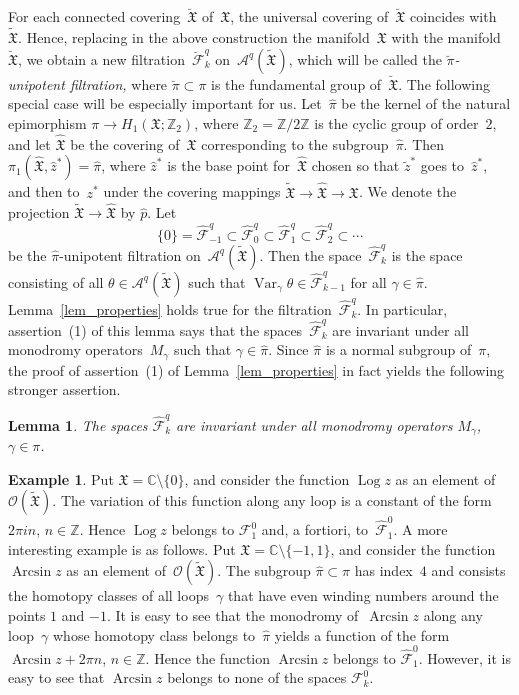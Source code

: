 \documentclass[reqno,tbtags,12pt]{amsart}
\numberwithin{equation}{section}
\newcommand{\C}{\mathbb{C}}
\newcommand{\Z}{\mathbb{Z}}
\newcommand{\FX}{\mathfrak{X}}
\newcommand{\tFX}{\widetilde{\mathfrak{X}}}
\newcommand{\hFX}{\widehat{\mathfrak{X}}}
\newcommand{\hpi}{\hat{\pi}}
\newcommand{\CF}{\mathcal{F}}
\newcommand{\hCF}{\widehat{\mathcal{F}}}
\newcommand{\CO}{\mathcal{O}}
\newcommand{\A}{\mathcal{A}}
\newcommand{\hp}{\hat{p}}
\newcommand{\tz}{\tilde{z}}
\newcommand{\hz}{\hat{z}}
\newcommand{\Arcsin}{\mathop{\mathrm{Arcsin}}\nolimits}
\newcommand{\Log}{\mathop{\mathrm{Log}}\nolimits}
\newcommand{\Var}{\mathop{\mathrm{Var}}\nolimits}
\newtheorem{lem}[theorem]{Lemma}
\theoremstyle{definition}
\newtheorem{example}[theorem]{Example}
\begin{document}
For each connected covering~$\breve{\FX}$ of~$\FX$, the universal covering of~$\breve{\FX}$ coincides with~$\tFX$. Hence, replacing in the above construction the manifold~$\FX$ with the manifold~$\breve{\FX}$, we obtain a new filtration~$\breve{\CF}_k^q$ on~$\A^q(\tFX)$, which will be called the \textit{$\breve{\pi}$-unipotent filtration,} where $\breve{\pi}\subset\pi$ is the fundamental group of~$\breve{\FX}$. The following special case will be especially important for us. Let~$\hpi$ be the kernel of the natural epimorphism $\pi\to H_1(\FX;\Z_2)$, where $\Z_2=\Z/2\Z$ is the cyclic group of order~$2$, and let $\hFX$ be the covering of~$\FX$ corresponding to the subgroup~$\hpi$.  Then $\pi_1(\hFX,\hz^*)=\hpi$, where $\hz^*$ is the base point for~$\hFX$  chosen so that $\tz^*$ goes to~$\hz^*$, and then to~$z^*$  under the covering mappings $\tFX\to\hFX\to\FX$. We denote the projection $\tFX\to\hFX$ by $\hp$. Let 
$$
\{0\}=\hCF_{-1}^q\subset\hCF_0^q\subset\hCF_1^q\subset\hCF_2^q\subset\cdots
$$
be the $\hpi$-unipotent filtration on~$\A^q(\tFX)$. Then the space~$\hCF_k^q$ is the space consisting of all   $\theta\in\A^q(\tFX)$ such that $\Var_{\gamma}\theta\in\hCF_{k-1}^q$ for all $\gamma\in\hpi$.
Lemma~\ref{lem_properties} holds true for the filtration~$\hCF_k^q$. In particular,  assertion~(1) of this lemma says that the spaces~$\hCF_k^q$ are invariant under all monodromy operators~$M_{\gamma}$ such that $\gamma\in\hpi$. Since $\hpi$ is a normal subgroup of~$\pi$, the proof of  assertion~(1) of Lemma~\ref{lem_properties} in fact yields the following stronger assertion.

\begin{lem}
The spaces $\hCF_k^q$ are invariant under all monodromy operators $M_{\gamma}$, $\gamma\in\pi$.
\end{lem} 

\begin{example}
Put $\FX=\C\setminus\{0\}$, and consider the function $\Log z$ as an element of~$\CO(\tFX)$. The variation of this function along any loop is a constant of the form $2\pi i n$, $n\in\Z$. Hence $\Log z$ belongs to $\CF^0_1$ and, a fortiori, to~$\hCF^0_1$. A more interesting example is as follows. Put $\FX=\C\setminus\{-1,1\}$, and consider the function $\Arcsin z$ as an element of~$\CO(\tFX)$. The subgroup $\hpi\subset\pi$ has index~$4$ and consists the homotopy classes of all loops~$\gamma$ that have  even winding numbers around the points $1$ and $-1$. It is easy to see that the monodromy of~$\Arcsin z$ along any loop~$\gamma$ whose homotopy class belongs to~$\hpi$ yields a function of the form $\Arcsin z+2\pi n$, $n\in\Z$. Hence the function $\Arcsin z$ belongs to $\hCF^{0}_1$. However, it is easy to see that $\Arcsin z$  belongs to none of the spaces $\CF^0_k$.
\end{example}
\end{document}
